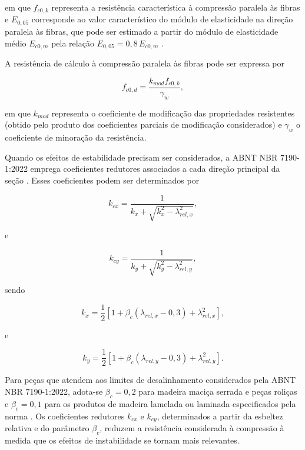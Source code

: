 em que \(f_{c0,k}\) representa a resistência característica à compressão paralela às fibras e \(E_{0,05}\) corresponde ao valor característico do módulo de elasticidade na direção paralela às fibras, que pode ser estimado a partir do módulo de elasticidade médio \(E_{c0,m}\) pela relação \(E_{0,05} = 0,8\,E_{c0,m}\) \cite{abnt2022nbr7190,silva2026ruptura}.

A resistência de cálculo à compressão paralela às fibras pode ser expressa por \cite{abnt2022nbr7190}

\begin{equation}
    f_{c0,d}
    =
    \frac{k_{mod} f_{c0,k}}{\gamma_w},
\end{equation}

em que \(k_{mod}\) representa o coeficiente de modificação das propriedades resistentes (obtido pelo produto dos coeficientes parciais de modificação considerados) e \(\gamma_w\) o coeficiente de minoração da resistência.

Quando os efeitos de estabilidade precisam ser considerados, a \gls{ABNT} \gls{NBR} 7190-1:2022 emprega coeficientes redutores associados a cada direção principal da seção \cite{abnt2022nbr7190}. Esses coeficientes podem ser determinados por

\begin{equation}
    k_{cx}
    =
    \frac{1}
    {k_x+\sqrt{k_x^2-\lambda_{rel,x}^2}},
\end{equation}

e

\begin{equation}
    k_{cy}
    =
    \frac{1}
    {k_y+\sqrt{k_y^2-\lambda_{rel,y}^2}},
\end{equation}

sendo

\begin{equation}
    k_x =
    \frac{1}{2}
    \left[
        1+\beta_c(\lambda_{rel,x}-0,3)
        +\lambda_{rel,x}^{2}
    \right],
\end{equation}

e

\begin{equation}
    k_y =
    \frac{1}{2}
    \left[
        1+\beta_c(\lambda_{rel,y}-0,3)
        +\lambda_{rel,y}^{2}
    \right].
\end{equation}

Para peças que atendem aos limites de desalinhamento considerados pela \gls{ABNT} \gls{NBR} 7190-1:2022, adota-se \(\beta_c=0,2\) para madeira maciça serrada e peças roliças e \(\beta_c=0,1\) para os produtos de madeira lamelada ou laminada especificados pela norma \cite{abnt2022nbr7190}. Os coeficientes redutores \(k_{cx}\) e \(k_{cy}\), determinados a partir da esbeltez relativa e do parâmetro \(\beta_c\), reduzem a resistência considerada à compressão à medida que os efeitos de instabilidade se tornam mais relevantes.

